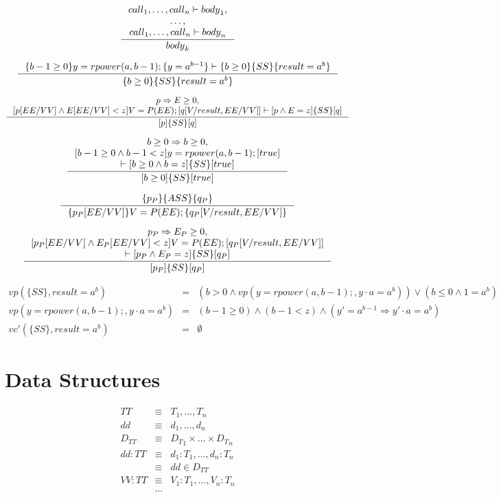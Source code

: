 \documentclass[12pt, a4paper]{book}
\begin{document}
  $$
  \inference{
    {call}_{1},\ldots,{call}_{n} \vdash {body}_{1}, \\
    \ldots, \\
    {call}_{1},\ldots,{call}_{n} \vdash {body}_{n}
  }
  {{body}_{k}}
  $$

  $$
  \inference
  {\{b - 1 \ge 0\} y = rpower(a,b-1); \{y = a^{b-1}\} \vdash \{b \ge 0 \} \{SS\} \{result=a^{b}\}}
  {\{b \ge 0\} \{SS\} \{result = a^{b}\}}
  $$

  $$
  \inference{
    p \Rightarrow E \ge 0, \\
    [p[EE/VV] \land E[EE/VV] < z] V=P(EE); [q[V/result, EE/VV]] \vdash [p \land E=z] \{SS\} [q]
  }
  {[p]\{SS\}[q]}
  $$

  $$
  \inference{
    b \ge 0 \Rightarrow b \ge 0, \\
    [b-1 \ge 0 \land b -1 < z] y=rpower(a, b-1); [true] \\
    \vdash [b \ge 0 \land b = z] \{SS\} [true]}
    {[b \ge 0] \{SS\} [true]}
  $$

  $$
  \inference{\{p_{P}\}\{ASS\}\{q_{P}\}}
  {\{p_{P}[EE/VV]\} V=P(EE);\{q_{P}[V/result,EE/VV]\}}
  $$

  $$
  \inference{
    p_{P} \Rightarrow E_{P} \ge 0, \\
    [p_{P}[EE/VV] \land E_{P}[EE/VV] < z] V = P(EE); [q_{P}[V/result, EE/VV]] \\
    \vdash [p_{P} \land E_{P} = z] \{SS\} [q_{P}]
  }
  {[p_{P}] \{SS\} [q_{P}]}
  $$

  \begin{eqnarray*}
      vp(\{SS\}, result=a^{b}) & = & (b > 0 \land vp(y=rpower(a, b-1);, y \cdot a = a^{b})) \lor (b \le 0 \land 1 = a^{b}) \\
      vp(y=rpower(a,b-1);, y \cdot a = a^{b}) & = & (b-1 \ge 0) \land (b - 1 < z) \land (y' = a^{b-1} \Rightarrow y' \cdot a = a^{b}) \\
      vc'(\{SS\}, result = a^{b}) & = & \emptyset
  \end{eqnarray*}



  \section{Data Structures}
  \label{sec:Data Structures}

  \begin{eqnarray*}
      TT & \equiv & T_1, \ldots, T_n \\
      dd & \equiv & d_1, \ldots, d_n \\
      D_{TT} & \equiv & {D_{T}}_{1} \times \ldots \times {D_{T}}_{n} \\
      dd:TT & \equiv & d_{1}:T_{1}, \ldots, d_{n}: T_{n} \\
      & \equiv & dd \in D_{TT} \\
      VV:TT & \equiv & V_{1}:T_{1}, \ldots, V_{n}:T_{n} \\
      & \ldots &
  \end{eqnarray*}
\end{document}
